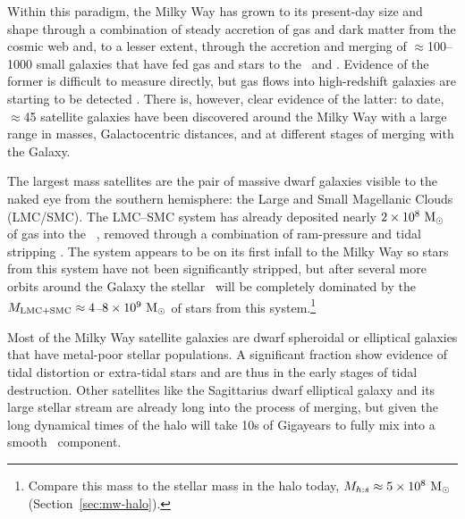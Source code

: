 Within this paradigm, the Milky Way has grown to its present-day size and shape
through a combination of steady accretion of gas and dark matter from the cosmic
web and, to a lesser extent, through the accretion and merging of $\approx$100--
1000 small galaxies that have fed gas and stars to the \mwdisk\ and \mwhalo.
Evidence of the former is difficult to measure directly, but gas flows into
high-redshift galaxies are starting to be detected \citep{martinc15}. There is,
however, clear evidence of the latter: to date, $\approx$45 satellite galaxies
have been discovered around the Milky Way with a large range in masses,
Galactocentric distances, and at different stages of merging with the Galaxy.

The largest mass satellites are the pair of massive dwarf galaxies visible to
the naked eye from the southern hemisphere: the Large and Small Magellanic
Clouds (LMC/SMC). The LMC--SMC system has already deposited nearly $2 \times
10^{8}~\mathrm{M}_\odot$ of gas into the \mwhalo\ \citep{putman03}, removed through a
combination of ram-pressure and tidal stripping \citep{salem15}. The system
appears to be on its first infall to the Milky Way \citep{besla10} so stars from
this system have not been significantly stripped, but after several more orbits
around the Galaxy the stellar \mwhalo\ will be completely dominated by the
$M_{\rm LMC+SMC} \approx 4$--$8 \times 10^{9}~\mathrm{M}_\odot$ \citep{jones94} of stars
from this system.\footnote{Compare this mass to the stellar mass in the halo
today, $M_{h:s} \approx 5 \times 10^8~\mathrm{M}_\odot$ (Section~\ref{sec:mw-halo}).}

Most of the Milky Way satellite galaxies are dwarf spheroidal or elliptical
galaxies that have metal-poor stellar populations. A significant fraction
show evidence of tidal distortion or extra-tidal stars
\citep[e.g.,][]{belokurov07c, coleman07} and are thus in the early stages of
tidal destruction. Other satellites like the Sagittarius dwarf elliptical galaxy
and its large stellar stream are already long into the process of merging, but
given the long dynamical times of the halo will take 10s of Gigayears to fully
mix into a smooth \mwhalo\ component.

